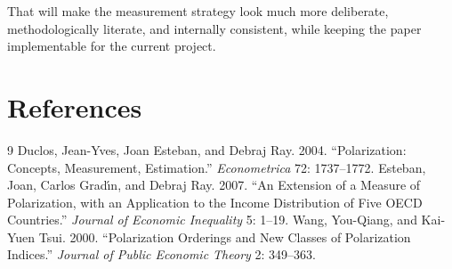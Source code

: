 \documentclass[12pt]{article}
\begin{document}
That will make the measurement strategy look much more deliberate, methodologically literate, and internally consistent, while keeping the paper implementable for the current project.

\section*{References}
\begin{thebibliography}{9}
\bibitem{} Duclos, Jean-Yves, Joan Esteban, and Debraj Ray. 2004. ``Polarization: Concepts, Measurement, Estimation.'' \emph{Econometrica} 72: 1737--1772.
\bibitem{} Esteban, Joan, Carlos Grad\'{\i}n, and Debraj Ray. 2007. ``An Extension of a Measure of Polarization, with an Application to the Income Distribution of Five OECD Countries.'' \emph{Journal of Economic Inequality} 5: 1--19.
\bibitem{} Wang, You-Qiang, and Kai-Yuen Tsui. 2000. ``Polarization Orderings and New Classes of Polarization Indices.'' \emph{Journal of Public Economic Theory} 2: 349--363.
\end{thebibliography}
\end{document}
